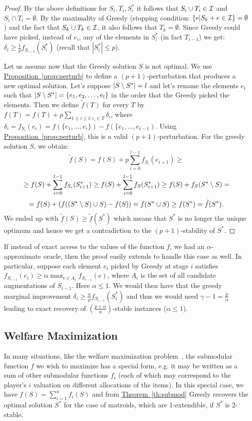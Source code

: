 \begin{proof}
By the above definitions for $S_i,T_i,S^*_i$ it follows that $S_i\cup T_i \in \mathcal{I}$ and $S_i \cap T_i=\emptyset$. By the maximality of Greedy (stopping condition: $\{e| S_k+e \in \mathcal{I}\}=\emptyset$) and the fact that $S_k\cup T_k \in \mathcal{I}$, it also follows that $T_k=\emptyset$. Since Greedy could have picked, instead of $e_i$, any of the elements in $S^*_i$ (in fact $T_{i-1}$) we get: $\delta_i \ge \tfrac{1}{p}f_{S_{i-1}}(S^*_i)$ (recall that $|S^*_i|\le p$).

Let us assume now that the Greedy solution $S$ is not optimal.
We use \hyperref[prop:perturb]{Proposition~\ref{prop:perturb}} to define a $(p+1)$-perturbation that produces a new optimal solution.
Let's suppose $|S\setminus S^*|=l$ and let's rename the elements $e_i$ such that $|S \setminus S^*|=\{e_1,e_2,\dots, e_l\}$ in the order that the Greedy picked the elements.
Then we define $\tilde{f}(T)$ for every $T$ by $f(T) = f(T) + p \sum_{1 \leq i \leq l: e_i \in T} \delta_i$, where $\delta_i = f_{S_i}(e_i) = f(\{e_1,\ldots,e_i\}) - f(\{e_1,\ldots,e_{i-1})$. Using \hyperref[prop:perturb]{Proposition~\ref{prop:perturb}}, this is a valid $(p+1)$-perturbation.
For the greedy solution $S$, we obtain:
\[ \tilde{f}(S) =  f(S) + p\sum_{i=0}^{l-1} f_{S_i}(e_{i+1}) \ge\]
\[ \ge f(S) + \sum_{i=0}^{l-1}f_{S_i}(S^*_{i+1}) \ge 
f(S) + \sum_{i=0}^{l-1}f_S(S^*_{i+1})\ge f(S) + f_S(S^*\setminus S)= \]
\[=f(S) + \left( f((S^*\setminus S)\cup S)- f(S)\right)=f(S^*\cup S)\ge f(S^*) = \tilde{f}(S^*).\]
We ended up with $\tilde{f}(S) \ge \tilde{f}(S^*)$ which means that $S^*$ is no longer the unique optimum and hence we get a contradiction to the $(p+1)$-stability of $S^*$.
\end{proof}


\begin{remark}
If instead of exact access to the values of the function $f$, we had an $\alpha$-approximate oracle, then the proof easily extends to handle this case as well. In particular, suppose each element $e_i$ picked by Greedy at stage $i$ satisfies $f_{S_{i-1}}(e_i)\ge \alpha \max_{e\in A_i} f_{S_{i-1}}(e)$, where $A_i$ is the set of all candidate augmentations of $S_{i-1}$. Here $\alpha\le 1$. We would then have that the greedy marginal improvement $\delta_i\ge \tfrac{\alpha}{p}f_{S_{i-1}}(S^*_i)$ and thus we would need $\gamma-1=\tfrac{p}{\alpha}$ leading to exact recovery of $\left(\tfrac{p+\alpha}{\alpha}\right)$-stable instances ($\alpha\le 1$).
\end{remark}


\subsection{Welfare Maximization}
In many situations, like the welfare maximization problem~\cite{lehmann2001combinatorial,nisan2007computationally,vondrak2008optimal}, the submodular function $f$ we wish to maximize has a special form, e.g. it may be written as a sum of other submodular functions $f_i$ (each of which may correspond to the player's $i$ valuation on different allocations of the items). In this special case, we have $f(S)=\sum_{i=1}^nf_i(S)$ and from \hyperref[th:submod]{Theorem~\ref{th:submod}} Greedy recovers the optimal solution $S^*$ for the case of matroids, which are 1-extendible, if $S^*$ is 2-stable. 

